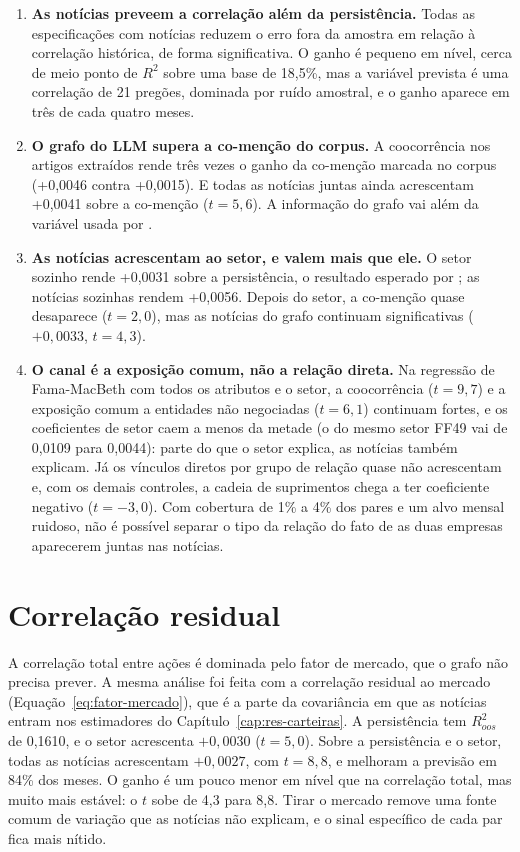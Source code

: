 \begin{enumerate}
  \item \textbf{As notícias preveem a correlação além da persistência.} Todas as especificações com
        notícias reduzem o erro fora da amostra em relação à correlação histórica, de forma
        significativa. O ganho é pequeno em nível, cerca de meio ponto de $R^2$
        sobre uma base de 18,5\%, mas a variável prevista é uma correlação de 21 pregões, dominada por
        ruído amostral, e o ganho aparece em três de cada quatro meses.
  \item \textbf{O grafo do LLM supera a co-menção do corpus.} A coocorrência nos artigos extraídos
        rende três vezes o ganho da co-menção marcada no corpus (+0,0046 contra +0,0015). E todas as
        notícias juntas ainda acrescentam +0,0041 sobre a co-menção ($t=5{,}6$). A informação do grafo
        vai além da variável usada por \citet{tang2019}.
  \item \textbf{As notícias acrescentam ao setor, e valem mais que ele.} O setor sozinho rende +0,0031
        sobre a persistência, o resultado esperado por \citet{elton1973}; as notícias sozinhas rendem
        +0,0056. Depois do setor, a co-menção quase desaparece ($t=2{,}0$), mas as notícias do grafo
        continuam significativas ($+0{,}0033$, $t=4{,}3$).
  \item \textbf{O canal é a exposição comum, não a relação direta.} Na regressão de Fama-MacBeth com
        todos os atributos e o setor, a coocorrência ($t=9{,}7$) e a exposição comum a entidades não
        negociadas ($t=6{,}1$) continuam fortes, e os coeficientes de setor caem a menos da metade (o do
        mesmo setor FF49 vai de 0,0109 para 0,0044): parte do que o setor explica, as notícias também
        explicam. Já os vínculos diretos por grupo de relação quase não acrescentam e, com os demais
        controles, a cadeia de suprimentos chega a ter coeficiente negativo ($t=-3{,}0$). Com cobertura
        de 1\% a 4\% dos pares e um alvo mensal ruidoso, não é possível separar o tipo da relação do fato
        de as duas empresas aparecerem juntas nas notícias.
\end{enumerate}

\section{Correlação residual}
\label{sec:h1-residual}

A correlação total entre ações é dominada pelo fator de mercado, que o grafo não precisa prever. A mesma
análise foi feita com a correlação residual ao mercado (Equação~\ref{eq:fator-mercado}), que é a parte da
covariância em que as notícias entram nos estimadores do Capítulo~\ref{cap:res-carteiras}. A persistência
tem $R^2_{oos}$ de 0,1610, e o setor acrescenta $+0{,}0030$ ($t=5{,}0$). Sobre a persistência e o setor, todas
as notícias acrescentam $+0{,}0027$, com $t=8{,}8$, e melhoram a previsão em 84\% dos meses. O ganho é um pouco menor em nível que na correlação
total, mas muito mais estável: o $t$ sobe de 4,3 para 8,8. Tirar o mercado remove uma fonte comum de
variação que as notícias não explicam, e o sinal específico de cada par fica mais nítido.

